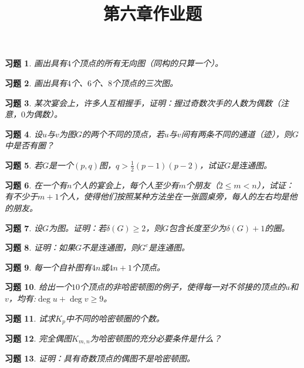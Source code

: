 \documentclass{article}
\begin{document}
\title{第六章作业题}
\begin{CJK}{UTF8}{gbsn}
  \newtheorem{Exercise}{习题}
  \date{}
  \maketitle
  \begin{Exercise}
    画出具有$4$个顶点的所有无向图（同构的只算一个）。  
\end{Exercise}
 \vspace{5cm}
\begin{Exercise}
画出具有$4$个、$6$个、$8$个顶点的三次图。
\end{Exercise}
\vspace{5cm}
\begin{Exercise}
某次宴会上，许多人互相握手，证明：握过奇数次手的人数为偶数（注意，$0$为偶数）。
\end{Exercise}
\vspace{5cm}
\begin{Exercise}
设$u$与$v$为图$G$的两个不同的顶点，若$u$与$v$间有两条不同的通道（迹），则$G$中是否有圈？
\end{Exercise}
\vspace{5cm}
\begin{Exercise}
若$G$是一个$(p,q)$图，$q > \frac{1}{2}(p-1)(p-2)$，试证$G$是连通图。  
\end{Exercise}
\vspace{5cm}
\begin{Exercise}
在一个有$n$个人的宴会上，每个人至少有$m$个朋友（$2\leq m < n$），试证：有不少于$m+1$个人，使得他们按照某种方法坐在一张圆桌旁，每人的左右均是他的朋友。
\end{Exercise}
\vspace{5cm}
\begin{Exercise}
设$G$为图。证明：若$\delta(G)\geq 2$，则$G$包含长度至少为$\delta(G)+1$的圈。  
\end{Exercise}
\vspace{5cm}
\begin{Exercise}
  证明：如果$G$不是连通图，则$G^c$是连通图。
\end{Exercise}
\vspace{5cm}
\begin{Exercise}
  每一个自补图有$4n$或$4n+1$个顶点。
\end{Exercise}
\vspace{5cm}
\begin{Exercise}
  给出一个$10$个顶点的非哈密顿图的例子，使得每一对不邻接的顶点的$u$和$v$，均有:$\deg u + \deg v \geq 9$。
\end{Exercise}
\vspace{5cm}
\begin{Exercise}
  试求$K_p$中不同的哈密顿圈的个数。
\end{Exercise}
\vspace{5cm}
\begin{Exercise}
  完全偶图$K_{m,n}$为哈密顿图的充分必要条件是什么？
\end{Exercise}
\vspace{5cm}
\begin{Exercise}
  证明：具有奇数顶点的偶图不是哈密顿图。
\end{Exercise}
\vspace{5cm}

\end{CJK}
\end{document}
